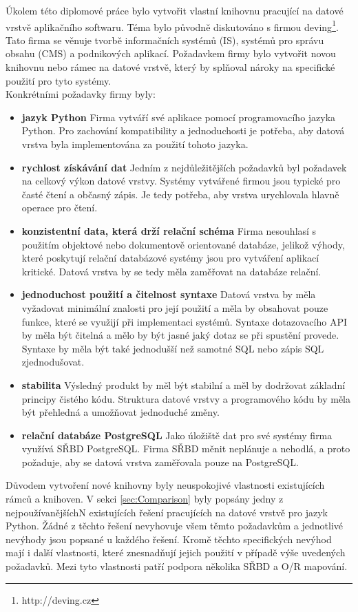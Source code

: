 \documentclass[ing,male,java,dept456]{diploma}						%
\begin{document}
Úkolem této diplomové práce bylo vytvořit vlastní knihovnu pracující na datové vrstvě aplikačního softwaru. Téma bylo původně diskutováno s firmou deving\footnote{http://deving.cz}. Tato firma se věnuje tvorbě informačních systémů (IS), systémů pro správu obsahu (CMS) a podnikových aplikací. Požadavkem firmy bylo vytvořit novou knihovnu nebo rámec na datové vrstvě, který by splňoval nároky na specifické použití pro tyto systémy. \\
Konkrétními požadavky firmy byly:
\begin{itemize}
\item \textbf{jazyk Python} Firma vytváří své aplikace pomocí programovacího jazyka Python. Pro zachování kompatibility a jednoduchosti je potřeba, aby datová vrstva byla implementována za použití tohoto jazyka.
\item \textbf{rychlost získávání dat} Jedním z nejdůležitějších požadavků byl požadavek na celkový výkon datové vrstvy. Systémy vytvářené firmou jsou typické pro časté čtení a občasný zápis. Je tedy potřeba, aby vrstva urychlovala hlavně operace pro čtení. 
\item \textbf{konzistentní data, která drží relační schéma} Firma nesouhlasí s použitím objektové nebo dokumentově orientované databáze, jelikož výhody, které poskytují relační databázové systémy jsou pro vytváření aplikací kritické. Datová vrstva by se tedy měla zaměřovat na databáze relační.
\item \textbf{jednoduchost použití a čitelnost syntaxe} Datová vrstva by měla vyžadovat minimální znalosti pro její použití a měla by obsahovat pouze funkce, které se využijí při implementaci systémů. Syntaxe dotazovacího API by měla být čitelná a mělo by být jasné jaký dotaz se při spustění provede. Syntaxe by měla být také jednodušší než samotné SQL nebo zápis SQL zjednodušovat.
\item \textbf{stabilita} Výsledný produkt by měl být stabilní a měl by dodržovat základní principy čistého kódu. Struktura datové vrstvy a programového kódu by měla být přehledná a umožňovat jednoduché změny.
\item \textbf{relační databáze PostgreSQL} Jako úložiště dat pro své systémy firma využívá SŘBD PostgreSQL. Firma SŘBD měnit neplánuje a nehodlá, a proto požaduje, aby se datová vrstva zaměřovala pouze na PostgreSQL.
\end{itemize}

Důvodem vytvoření nové knihovny byly neuspokojivé vlastnosti existujících rámců a knihoven. V sekci \ref{sec:Comparison} byly popsány jedny z nejpoužívanějšíchN existujících řešení pracujících na datové vrstvě pro jazyk Python. Žádné z těchto řešení nevyhovuje všem těmto požadavkům a jednotlivé nevýhody jsou popsané u každého řešení. Kromě těchto specifických nevýhod mají i další vlastnosti, které znesnadňují jejich použití v případě výše uvedených požadavků. Mezi tyto vlastnosti patří podpora několika SŘBD a O/R mapování. 
\end{document}
